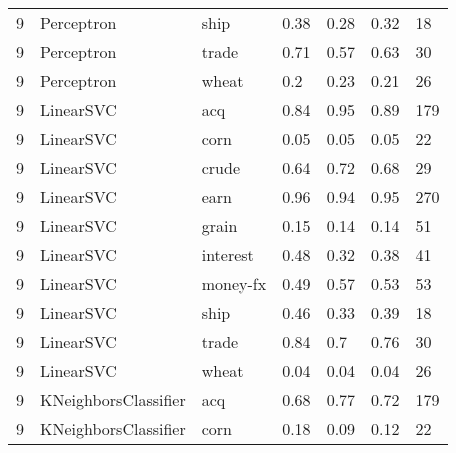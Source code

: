 \documentclass{article}
\begin{document}
\begin{table}[h]
\begin{tabular}{lllllll}
9             & Perceptron             & ship            & 0.38               & 0.28            & 0.32              & 18               \\
9             & Perceptron             & trade           & 0.71               & 0.57            & 0.63              & 30               \\
9             & Perceptron             & wheat           & 0.2                & 0.23            & 0.21              & 26               \\
9             & LinearSVC              & acq             & 0.84               & 0.95            & 0.89              & 179              \\
9             & LinearSVC              & corn            & 0.05               & 0.05            & 0.05              & 22               \\
9             & LinearSVC              & crude           & 0.64               & 0.72            & 0.68              & 29               \\
9             & LinearSVC              & earn            & 0.96               & 0.94            & 0.95              & 270              \\
9             & LinearSVC              & grain           & 0.15               & 0.14            & 0.14              & 51               \\
9             & LinearSVC              & interest        & 0.48               & 0.32            & 0.38              & 41               \\
9             & LinearSVC              & money-fx        & 0.49               & 0.57            & 0.53              & 53               \\
9             & LinearSVC              & ship            & 0.46               & 0.33            & 0.39              & 18               \\
9             & LinearSVC              & trade           & 0.84               & 0.7             & 0.76              & 30               \\
9             & LinearSVC              & wheat           & 0.04               & 0.04            & 0.04              & 26               \\
9             & KNeighborsClassifier   & acq             & 0.68               & 0.77            & 0.72              & 179              \\
9             & KNeighborsClassifier   & corn            & 0.18               & 0.09            & 0.12              & 22               \\

\end{tabular}
\end{table}
\end{document}
